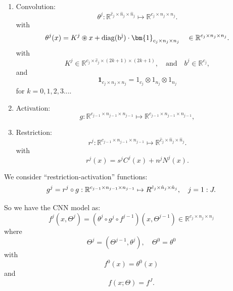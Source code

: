 \begin{enumerate}
	
	\item Convolution: 
	\begin{equation}
	\theta^j: \mathbb R^{\hat c_j \times \hat{n}_{j} \times \hat n_{j} } \mapsto \mathbb{R}^{c_j \times n_{j} \times n_j }.
	\end{equation}
	with
	\begin{equation}
	\theta^j(x) = K^j \circledast x + {\rm{diag}(b^j)} \cdot \bm{1}_{c_j \times n_j \times n_j} \quad
	\in\mathbb R^{c_j\times n_j\times n_j}.
	\end{equation}
	with 
	\begin{equation}
	K^j \in \mathbb{R}^{ c_{j} \times \hat c_{j} \times (2k+1) \times (2k+1)},  \quad \text{and} \quad b^j \in \mathbb{R}^{c_j},
	\end{equation}
	and 
	\begin{equation}
	\bm{1}_{c_j \times n_j \times n_j} = 1_{c_{j}} \otimes 1_{n_j} \otimes 1_{n_j}
	\end{equation}
	for $k = 0, 1, 2, 3...$.
	
	\item Activation: 
	\begin{equation}\label{CNN_iteration_vector}
	g: \mathbb R^{c_{j-1} \times  n_{j-1} \times   n_{j-1} }\mapsto  \mathbb R^{c_{j-1} \times n_{j-1} \times n_{j-1}},
	\end{equation}
	
	
	\item Restriction: 
	\begin{equation}
	r^j: \mathbb R^{c_{j-1} \times n_{j-1} \times n_{j-1} }\mapsto  \mathbb R^{\hat c_j \times \hat n_{j} \times\hat n_j }.\end{equation}
	with
	\begin{equation}
	r^j(x) = s^j C^j(x) + n^j N^j(x).
	\end{equation}
	
\end{enumerate}

We consider ``restriction-activation'' functions:
\begin{equation}\label{CNN_iteration_vector}
g^j=r^j\circ g:  \mathbb R^{c_{j-1} \times n_{j-1} \times n_{j-1} }\mapsto
\mathbb  \mathbb R^{\hat c_j \times \hat n_{j} \times \hat n_j }, \quad j  = 1:J. 
\end{equation}

So we have the CNN model  as:
\begin{equation}\label{CNN_iteration_vector}
f^j(x,\Theta^j) = (\theta^j\circ g^{j}\circ f^{j-1})(x,\Theta^{j-1}) \in \mathbb{R}^{c_j \times n_j \times n_j }
\end{equation}
where
\begin{equation}
\Theta^j=(\Theta^{j-1},\theta^j), \quad \Theta^0=\theta^0 
\end{equation}
with 
\begin{equation}
f^0(x)=\theta^0(x)
\end{equation}
and 
\begin{equation}\label{CNN_finallayer}
f(x; \Theta) = f^J.
\end{equation}

